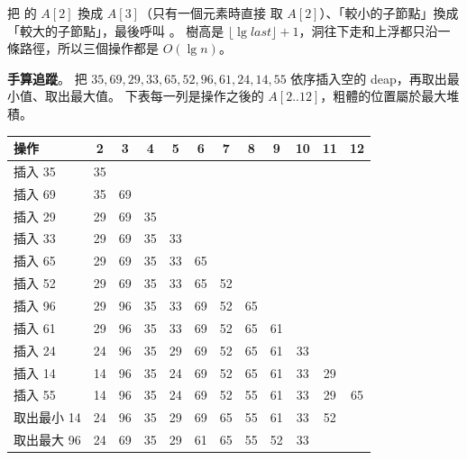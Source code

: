 把  的 $A[2]$ 換成 $A[3]$（只有一個元素時直接
取 $A[2]$）、「較小的子節點」換成「較大的子節點」，最後呼叫 。 樹高是
$\lfloor \lg \mathit{last} \rfloor + 1$，洞往下走和上浮都只沿一條路徑，所以三個操作都是
$O(\lg n)$。

\textbf{手算追蹤}。 把 $35, 69, 29, 33, 65, 52, 96, 61, 24, 14, 55$ 依序插入空的 deap，再取出最
小值、取出最大值。 下表每一列是操作之後的 $A[2..12]$，粗體的位置屬於最大堆積。

\begin{center}
\small
\begin{tabular}{l*{11}{c}}
\toprule
操作 & 2 & \textbf{3} & 4 & 5 & \textbf{6} & \textbf{7} & 8 & 9 & 10 & 11 & \textbf{12} \\
\midrule
插入 35 & 35 \\
插入 69 & 35 & 69 \\
插入 29 & 29 & 69 & 35 \\
插入 33 & 29 & 69 & 35 & 33 \\
插入 65 & 29 & 69 & 35 & 33 & 65 \\
插入 52 & 29 & 69 & 35 & 33 & 65 & 52 \\
插入 96 & 29 & 96 & 35 & 33 & 69 & 52 & 65 \\
插入 61 & 29 & 96 & 35 & 33 & 69 & 52 & 65 & 61 \\
插入 24 & 24 & 96 & 35 & 29 & 69 & 52 & 65 & 61 & 33 \\
插入 14 & 14 & 96 & 35 & 24 & 69 & 52 & 65 & 61 & 33 & 29 \\
插入 55 & 14 & 96 & 35 & 24 & 69 & 52 & 55 & 61 & 33 & 29 & 65 \\
\midrule
取出最小 14 & 24 & 96 & 35 & 29 & 69 & 65 & 55 & 61 & 33 & 52 \\
取出最大 96 & 24 & 69 & 35 & 29 & 61 & 65 & 55 & 52 & 33 \\
\bottomrule
\end{tabular}
\end{center}

